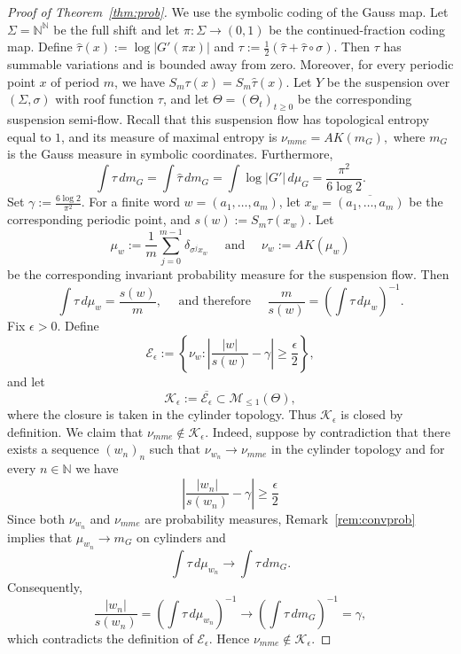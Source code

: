 \documentclass[letterpaper,11pt]{amsart}
\numberwithin{equation}{section}     %
\newcommand{\N}{\mathbb{N}}
\def\N{{\mathbb N}}
\def\le{\leqslant}
\def\ge{\geqslant}
\begin{document}
\begin{proof}[Proof of Theorem~\ref{thm:prob}]
We use the symbolic coding of the Gauss map. Let
\(\Sigma=\mathbb N^{\mathbb N}\) be the full shift and let
\(\pi:\Sigma\to(0,1)\) be the continued-fraction coding map. Define $\widehat\tau(x):=\log |G'(\pi x)|$ and
$\tau:=\frac12\left(\widehat\tau+\widehat\tau\circ\sigma\right)$. Then $\tau$ has summable variations and is bounded away from zero. Moreover, for every periodic point $x$ of period $m$, we have $S_m\tau(x)=S_m\widehat\tau(x)$.
Let $Y$ be the suspension over $(\Sigma,\sigma)$ with roof function $\tau$, and let $\Theta=(\Theta_t)_{t\ge0}$ be the corresponding suspension semi-flow. Recall that this suspension flow has topological entropy equal to $1$, and its measure of maximal entropy is $\nu_{mme}=AK(m_G),$
where $m_G$ is the Gauss measure in symbolic coordinates. Furthermore,
\[
\int \tau\,dm_G
=
\int \widehat\tau\,dm_G
=
\int \log |G'|\,d\mu_G
=
\frac{\pi^2}{6\log 2}.
\]
Set $\gamma:=\frac{6\log 2}{\pi^2}$. For a finite word $w=(a_1,\ldots,a_m)$, let $x_w=\overline{(a_1,\ldots,a_m)}$
be the corresponding periodic point, and $s(w):=S_m\tau(x_w).$
Let
\[
\mu_w:=\frac1m\sum_{j=0}^{m-1}\delta_{\sigma^j x_w}
\quad \text{ and } \quad \nu_w:=AK(\mu_w)
\]
be the corresponding invariant probability measure for the suspension flow. Then
\[
\int\tau\,d\mu_w=\frac{s(w)}{m},
\quad \text{ and therefore } \quad
\frac{m}{s(w)}
=
\left(\int\tau\,d\mu_w\right)^{-1}.
\]
Fix $\epsilon>0$. Define
\[
\mathcal E_\epsilon
:=
\left\{
\nu_w:
\left|
\frac{|w|}{s(w)}-\gamma
\right|
\ge \frac{\epsilon}{2}
\right\},
\]
and let
\[
\mathcal K_\epsilon
:=
\overline{\mathcal E_\epsilon}
\subset \mathcal M_{\le1}(\Theta),
\]
where the closure is taken in the cylinder topology. Thus
\(\mathcal K_\epsilon\) is closed by definition.
We claim that $\nu_{mme}\notin \mathcal K_\epsilon$.
Indeed, suppose by contradiction that there exists a sequence $(w_n)_n$ such that $\nu_{w_n}\to\nu_{mme}$
in the cylinder topology and for every $n \in \N$ we have
\[
\left|
\frac{|w_n|}{s(w_n)}-\gamma
\right|
\ge \frac{\epsilon}{2}
\]
Since both $\nu_{w_n}$ and $\nu_{mme}$ are probability measures, Remark~\ref{rem:convprob} implies that
$\mu_{w_n}\to m_G$ on cylinders and
\[
\int\tau\,d\mu_{w_n}
\longrightarrow
\int\tau\,dm_G .
\]
Consequently,
\[
\frac{|w_n|}{s(w_n)}
=
\left(\int\tau\,d\mu_{w_n}\right)^{-1}
\longrightarrow
\left(\int\tau\,dm_G\right)^{-1}
=
\gamma,
\]
which contradicts the definition of \(\mathcal E_\epsilon\). Hence
\(\nu_{mme}\notin\mathcal K_\epsilon\).


\end{proof}
\end{document}
